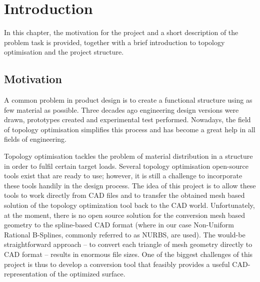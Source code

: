 \chapter{Introduction}
\label{chapter:Introduction}

In this chapter, the motivation for the project and a short description of the problem task is provided, together with a brief introduction to topology optimisation and the project structure.
\section{Motivation}
A common problem in product design is to create a functional structure using as few material as possible. Three decades ago engineering design versions were drawn, prototypes created and experimental test performed. Nowadays, the field of topology optimisation simplifies this process and has become a great help in all fields of engineering. 

Topology optimisation tackles the problem of material distribution in a structure in order to fulfil certain target loads. Several topology optimisation open-source tools exist that are ready to use; however, it is still a challenge to incorporate these tools handily in the design process. The idea of this project is to allow these tools to work directly from CAD files and to transfer the obtained mesh based solution of the topology optimization tool back to the CAD world. Unfortunately, at the moment, there is no open source solution for the conversion mesh based geometry to the spline-based CAD format (where in our case Non-Uniform Rational B-Splines, commonly referred to as NURBS, are used). The would-be straightforward approach -- to convert each triangle of mesh geometry directly to CAD format -- results in enormous file sizes. One of the biggest challenges of this project is thus to develop a conversion tool that feasibly provides a useful CAD-representation of the optimized surface.


%
%

